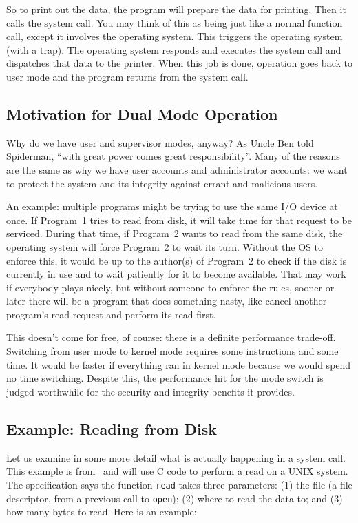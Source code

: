 So to print out the data, the program will prepare the data for printing. Then it calls the system call. You may think of this as being just like a normal function call, except it involves the operating system. This triggers the operating system (with a trap). The operating system responds and executes the system call and dispatches that data to the printer. When this job is done, operation goes back to user mode and the program returns from the system call.

\subsection*{Motivation for Dual Mode Operation}

Why do we have user and supervisor modes, anyway? As Uncle Ben told Spiderman, ``with great power comes great responsibility''. Many of the reasons are the same as why we have user accounts and administrator accounts: we want to protect the system and its integrity against errant and malicious users.

An example: multiple programs might be trying to use the same I/O device at once. If Program~1 tries to read from disk, it will take time for that request to be serviced. During that time, if Program~2 wants to read from the same disk, the operating system will force Program~2 to wait its turn. Without the OS to enforce this, it would be up to the author(s) of Program~2 to check if the disk is currently in use and to wait patiently for it to become available. That may work if everybody plays nicely, but without someone to enforce the rules, sooner or later there will be a program that does something nasty, like cancel another program's read request and perform its read first.

This doesn't come for free, of course: there is a definite performance trade-off. Switching from user mode to kernel mode requires some instructions and some time. It would be faster if everything ran in kernel mode because we would spend no time switching. Despite this, the performance hit for the mode switch is judged worthwhile for the security and integrity benefits it provides.

\subsection*{Example: Reading from Disk}
Let us examine in some more detail what is actually happening in a 
system call. This example is from~\cite{mos} and will use C code to 
perform a read on a UNIX system. The specification says the function 
\texttt{read} takes three parameters: (1) the file (a file 
descriptor, from a previous call to \texttt{open}); (2) where to read 
the data to; and (3) how many bytes to read. Here is an example: 

